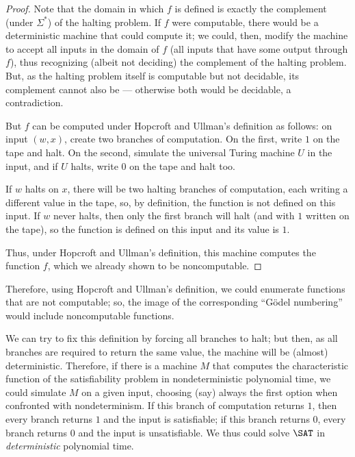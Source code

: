 \documentclass[12pt]{article}
\theoremstyle{definition}
\begin{document}
\begin{proof}
    Note that the domain in which $f$ is defined is exactly
    the complement (under $\Sigma^*$) of the halting problem.
    If $f$ were computable,
    there would be a deterministic machine that could compute it;
    we could, then, modify the machine to accept all inputs in the domain of $f$
    (all inputs that have some output through $f$),
    thus recognizing (albeit not deciding) the complement of the halting problem.
    But, as the halting problem itself is computable but not decidable,
    its complement cannot also be --- otherwise both would be decidable,
    a contradiction.

    But $f$ can be computed under Hopcroft and Ullman's definition as follows:
    on input $(w, x)$,
    create two branches of computation.
    On the first, write $1$ on the tape and halt.
    On the second, simulate the universal Turing machine $U$ in the input,
    and if $U$ halts, write $0$ on the tape and halt too.

    If $w$ halts on $x$,
    there will be two halting branches of computation,
    each writing a different value in the tape,
    so, by definition, the function is not defined on this input.
    If $w$ never halts,
    then only the first branch will halt
    (and with $1$ written on the tape),
    so the function is defined on this input and its value is $1$.

    Thus, under Hopcroft and Ullman's definition,
    this machine computes the function $f$,
    which we already shown to be noncomputable.
\end{proof}

Therefore,
using Hopcroft and Ullman's definition,
we could enumerate functions that are not computable;
so, the image of the corresponding ``Gödel numbering''
would include noncomputable functions.

We can try to fix this definition by forcing all branches to halt;
but then, as all branches are required to return the same value,
the machine will be (almost) deterministic.
Therefore, if there is a machine $M$ that computes the characteristic function
of the satisfiability problem in nondeterministic polynomial time,
we could simulate $M$ on a given input,
choosing (say) always the first option when confronted with nondeterminism.
If this branch of computation returns $1$,
then every branch returns $1$ and the input is satisfiable;
if this branch returns $0$, every branch returns $0$ and the input is unsatisfiable.
We thus could solve $\SAT$ in \emph{deterministic} polynomial time.
\end{document}
